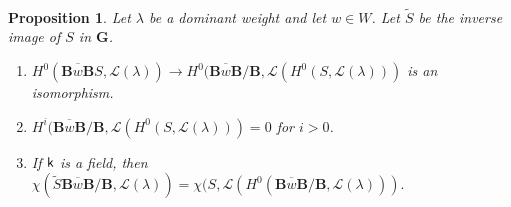 \documentclass[sn-mathphys-num]{sn-jnl}%
\newcommand{\Ll}{\mathcal L}
\newcommand{\sk}{{\sf k}}
\newcommand{\bg}{\mathbf G}
\newcommand{\fb}{\mathbf B}
\newtheorem{proposition}[theorem]{Proposition}
\theoremstyle{definition}
\begin{document}
\

  \begin{proposition}\label{prop:Leray}
  Let $\lambda$ be a dominant weight and let $w\in W$. Let  $\tilde S$ be the inverse image of $S$ in $ \bg $.
   \begin{enumerate} 
 \item $H^0(\overline{{\fb}w{\fb}} S,\Ll(\lambda))\to H^0({\overline{{\fb}w{\fb}}/{\fb}},\Ll(H^0(S,\Ll(\lambda)))$ is an isomorphism.
 \label{Leray1}
  \item  $H^i({\overline{{\fb}w{\fb}}/{\fb}},\Ll(H^0(S,\Ll(\lambda)))=0$ for $i>0$.
  \label{Leray2}
 \item If $\sk$ is a field, then
 $
     \chi(\tilde S\overline{{\fb}w{\fb}}/\fb ,\Ll(\lambda))= \chi(S,\Ll(H^0({\overline{{\fb}w{\fb}}/{\fb}},\Ll(\lambda))).
 $
 \label{Leray3}
  \end{enumerate}
 \end{proposition}
\end{document}
